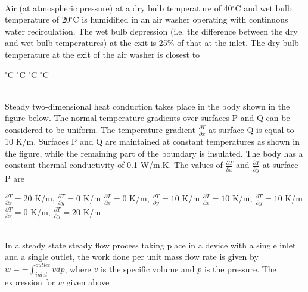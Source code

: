 \documentclass[addpoints,11pt]{exam}
\begin{document}
\begin{questions}
        \begin{oneparchoices}
        \end{oneparchoices}\\

        \question Air (at atmospheric pressure) at a dry bulb temperature of 40$^\circ$C and wet bulb temperature of 20$^\circ$C is humidified in an air washer operating with continuous water recirculation. The wet bulb depression (i.e. the difference between the dry and wet bulb temperatures) at the exit is 25\% of that at the inlet. The dry bulb temperature at the exit of the air washer is closest to\\

        \begin{oneparchoices}
            $^\circ$C
            $^\circ$C
            $^\circ$C
            $^\circ$C
        \end{oneparchoices}\\

        \question Steady two-dimensional heat conduction takes place in the body shown in the figure below. The normal temperature gradients over surfaces P and Q can be considered to be uniform. The temperature gradient $\frac{\partial{T}}{\partial{x}}$ at surface Q is equal to 10 K/m. Surfaces P and Q are maintained at constant temperatures as shown in the figure, while the remaining part of the boundary is insulated. The body has a constant thermal conductivity of 0.1 W/m.K. The values of $\frac{\partial{T}}{\partial{x}}$ and $\frac{\partial{T}}{\partial{y}}$ at surface P are%

        \begin{oneparchoices}
            \choice $\frac{\partial{T}}{\partial{x}} = 20$ K/m, $\frac{\partial{T}}{\partial{y}} = 0$ K/m
            \choice $\frac{\partial{T}}{\partial{x}} = 0$ K/m, $\frac{\partial{T}}{\partial{y}} = 10$ K/m
            \choice $\frac{\partial{T}}{\partial{x}} = 10$ K/m, $\frac{\partial{T}}{\partial{y}} = 10$ K/m
            \choice $\frac{\partial{T}}{\partial{x}} = 0$ K/m, $\frac{\partial{T}}{\partial{y}} = 20$ K/m
        \end{oneparchoices}\\

        \question In a steady state steady flow process taking place in a device with a single inlet and a single outlet, the work done per unit mass flow rate is given by $w=-\int_{inlet}^{outlet} vdp$, where $v$ is the specific volume and $p$ is the pressure. The expression for $w$ given above\\


\end{questions}
\end{document}
